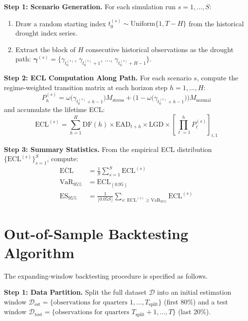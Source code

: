 \documentclass[12pt,a4paper]{article}
\newcommand{\Mnormal}{M_{\text{normal}}}
\newcommand{\Mstress}{M_{\text{stress}}}
\begin{document}
\textbf{Step 1: Scenario Generation.} For each simulation run $s = 1, \ldots, S$:
\begin{enumerate}[noitemsep]
    \item Draw a random starting index $t_0^{(s)} \sim \text{Uniform}\{1, T - H\}$ from the historical drought index series.
    \item Extract the block of $H$ consecutive historical observations as the drought path: $\boldsymbol{\gamma}^{(s)} = \{\gamma_{t_0^{(s)}},\, \gamma_{t_0^{(s)}+1},\, \ldots,\, \gamma_{t_0^{(s)}+H-1}\}$.
\end{enumerate}

\textbf{Step 2: ECL Computation Along Path.} For each scenario $s$, compute the regime-weighted transition matrix at each horizon step $h = 1, \ldots, H$:
\begin{equation}
P_h^{(s)} = \omega\bigl(\gamma_{t_0^{(s)}+h-1}\bigr) \Mstress + \bigl(1 - \omega\bigl(\gamma_{t_0^{(s)}+h-1}\bigr)\bigr) \Mnormal
\end{equation}
and accumulate the lifetime ECL:
\begin{equation}
\text{ECL}^{(s)} = \sum_{h=1}^{H} \text{DF}(h) \times \text{EAD}_{t+h} \times \text{LGD} \times \left[\prod_{\ell=1}^{h} P_{\ell}^{(s)}\right]_{i,1}
\end{equation}

\textbf{Step 3: Summary Statistics.} From the empirical ECL distribution $\{\text{ECL}^{(s)}\}_{s=1}^{S}$, compute:
\begin{align}
\overline{\text{ECL}} &= \frac{1}{S} \sum_{s=1}^{S} \text{ECL}^{(s)} \\
\text{VaR}_{95\%} &= \text{ECL}_{(0.95)} \\
\text{ES}_{95\%} &= \frac{1}{\lfloor 0.05 S \rfloor} \sum_{s:\, \text{ECL}^{(s)} \geq \text{VaR}_{95\%}} \text{ECL}^{(s)}
\end{align}

\section{Out-of-Sample Backtesting Algorithm}
\label{app:backtest}

The expanding-window backtesting procedure is specified as follows.

\textbf{Step 1: Data Partition.} Split the full dataset $\mathcal{D}$ into an initial estimation window $\mathcal{D}_{\text{est}} = \{\text{observations for quarters } 1, \ldots, T_{\text{split}}\}$ (first 80\%) and a test window $\mathcal{D}_{\text{test}} = \{\text{observations for quarters } T_{\text{split}}+1, \ldots, T\}$ (last 20\%).
\end{document}

